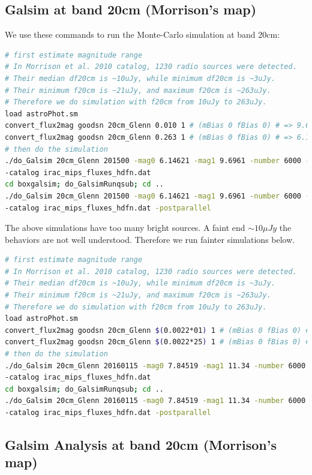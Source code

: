 \documentclass[11pt,a4paper]{article}
\begin{document}
\subsection{Galsim at band 20cm (Morrison's map)}

We use these commands to run the Monte-Carlo simulation at band 20cm:

\begin{lstlisting}[language=bash]
# first estimate magnitude range
# In Morrison et al. 2010 catalog, 1230 radio sources were detected. 
# Their median df20cm is ~10uJy, while minimum df20cm is ~3uJy. 
# Their minimum f20cm is ~21uJy, and maximum f20cm is ~263uJy. 
# Therefore we do simulation with f20cm from 10uJy to 263uJy. 
load astroPhot.sm
convert_flux2mag goodsn 20cm_Glenn 0.010 1 # (mBias 0 fBias 0) # => 9.6961
convert_flux2mag goodsn 20cm_Glenn 0.263 1 # (mBias 0 fBias 0) # => 6.14621
# then do the simulation
./do_Galsim 20cm_Glenn 201500 -mag0 6.14621 -mag1 9.6961 -number 6000 -vary \
-catalog irac_mips_fluxes_hdfn.dat
cd boxgalsim; do_GalsimRunqsub; cd ..
./do_Galsim 20cm_Glenn 201500 -mag0 6.14621 -mag1 9.6961 -number 6000 -vary \
-catalog irac_mips_fluxes_hdfn.dat -postparallel
\end{lstlisting}

The above simulations have too many bright sources. A faint end $\sim10{\mu}Jy$ the behaviors are not well understood. Therefore we run fainter simulations below. 

\begin{lstlisting}[language=bash]
# first estimate magnitude range
# In Morrison et al. 2010 catalog, 1230 radio sources were detected. 
# Their median df20cm is ~10uJy, while minimum df20cm is ~3uJy. 
# Their minimum f20cm is ~21uJy, and maximum f20cm is ~263uJy. 
# Therefore we do simulation with f20cm from 10uJy to 263uJy. 
load astroPhot.sm
convert_flux2mag goodsn 20cm_Glenn $(0.0022*01) 1 # (mBias 0 fBias 0) # => 11.34
convert_flux2mag goodsn 20cm_Glenn $(0.0022*25) 1 # (mBias 0 fBias 0) # => 7.84519
# then do the simulation
./do_Galsim 20cm_Glenn 20160115 -mag0 7.84519 -mag1 11.34 -number 6000 -vary \
-catalog irac_mips_fluxes_hdfn.dat
cd boxgalsim; do_GalsimRunqsub; cd ..
./do_Galsim 20cm_Glenn 20160115 -mag0 7.84519 -mag1 11.34 -number 6000 -vary \
-catalog irac_mips_fluxes_hdfn.dat -postparallel
\end{lstlisting}

\subsection{Galsim Analysis at band 20cm (Morrison's map)}
\end{document}
